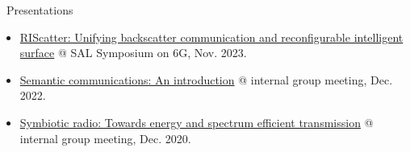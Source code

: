 \documentclass{cv}
\begin{document}
\begin{section}{\faComment\ Presentations}
	\begin{itemize}
		\item \href{https://github.com/snowztail/riscatter-unifying-backscatter-communication-and-reconfigurable-intelligent-surface/blob/master/poster/beamer.pdf}{RIScatter: Unifying backscatter communication and reconfigurable intelligent surface} @ SAL Symposium on 6G, Nov. 2023.
		\item \href{https://github.com/snowztail/presentations/blob/master/semantic-communications-an-introduction/slides.pdf}{Semantic communications: An introduction} @ internal group meeting, Dec. 2022.
		\item \href{https://github.com/snowztail/presentations/blob/master/symbiotic-radio-towards-energy-and-spectrum-efficient-transmission/main.pdf}{Symbiotic radio: Towards energy and spectrum efficient transmission} @ internal group meeting, Dec. 2020.
	\end{itemize}
\end{section}

\vspace{-1.5em}
\end{document}
